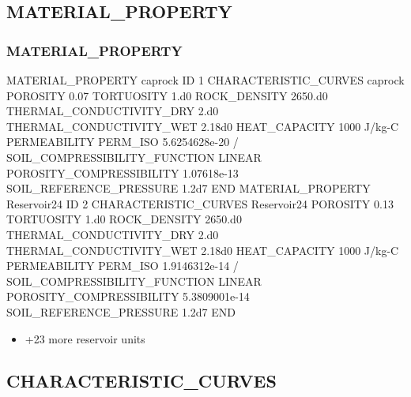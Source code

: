\documentclass{beamer}
\begin{document}
\subsection{MATERIAL\_PROPERTY}

\begin{frame}\frametitle{MATERIAL\_PROPERTY}

\begin{semiverbatim}
MATERIAL_PROPERTY caprock
  ID 1
  CHARACTERISTIC_CURVES caprock
  POROSITY 0.07
  TORTUOSITY 1.d0
  ROCK_DENSITY 2650.d0
  THERMAL_CONDUCTIVITY_DRY 2.d0
  THERMAL_CONDUCTIVITY_WET 2.18d0
  HEAT_CAPACITY 1000 J/kg-C
  PERMEABILITY
    PERM_ISO 5.6254628e-20
  /
  SOIL_COMPRESSIBILITY_FUNCTION LINEAR
  POROSITY_COMPRESSIBILITY 1.07618e-13
  SOIL_REFERENCE_PRESSURE 1.2d7
END \newpage
MATERIAL_PROPERTY Reservoir24
  ID 2
  CHARACTERISTIC_CURVES Reservoir24
  POROSITY 0.13
  TORTUOSITY 1.d0
  ROCK_DENSITY 2650.d0
  THERMAL_CONDUCTIVITY_DRY 2.d0
  THERMAL_CONDUCTIVITY_WET 2.18d0
  HEAT_CAPACITY 1000 J/kg-C
  PERMEABILITY
    PERM_ISO 1.9146312e-14
  /
  SOIL_COMPRESSIBILITY_FUNCTION LINEAR
  POROSITY_COMPRESSIBILITY 5.3809001e-14
  SOIL_REFERENCE_PRESSURE 1.2d7
END
\end{semiverbatim}
\newpage
\begin{itemize}
  \item +23 more reservoir units
\end{itemize}

\end{frame}

\subsection{CHARACTERISTIC\_CURVES}
\end{document}
